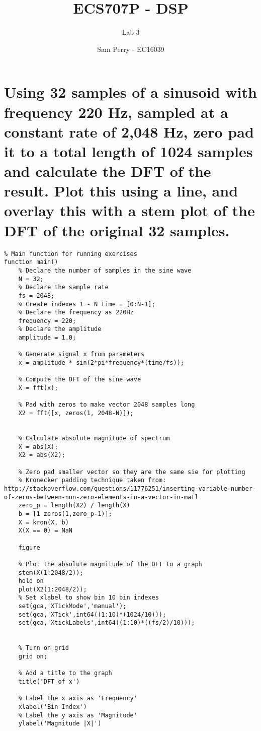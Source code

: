\documentclass[titlepage]{scrartcl}
\begin{document}
\title{ECS707P - DSP}
\subtitle{\LARGE{Lab 3}}
\author{Sam Perry - EC16039}

\maketitle

\section{Using 32 samples of a sinusoid with frequency 220 Hz, sampled at a
constant rate of 2,048 Hz, zero pad it to a total length of 1024 samples and
calculate the DFT of the result. Plot this using a line, and overlay this with
a stem plot of the DFT of the original 32 samples.}
\begin{lstlisting}
% Main function for running exercises
function main()
    % Declare the number of samples in the sine wave
    N = 32;
    % Declare the sample rate
    fs = 2048;
    % Create indexes 1 - N time = [0:N-1];
    % Declare the frequency as 220Hz
    frequency = 220;
    % Declare the amplitude
    amplitude = 1.0;

    % Generate signal x from parameters
    x = amplitude * sin(2*pi*frequency*(time/fs));

    % Compute the DFT of the sine wave
    X = fft(x);
    
    % Pad with zeros to make vector 2048 samples long
    X2 = fft([x, zeros(1, 2048-N)]);


    % Calculate absolute magnitude of spectrum
    X = abs(X);
    X2 = abs(X2);

    % Zero pad smaller vector so they are the same sie for plotting
    % Kronecker padding technique taken from: http://stackoverflow.com/questions/11776251/inserting-variable-number-of-zeros-between-non-zero-elements-in-a-vector-in-matl
    zero_p = length(X2) / length(X)
    b = [1 zeros(1,zero_p-1)];
    X = kron(X, b)
    X(X == 0) = NaN

    figure

    % Plot the absolute magnitude of the DFT to a graph
    stem(X(1:2048/2));
    hold on
    plot(X2(1:2048/2));
    % Set xlabel to show bin 10 bin indexes
    set(gca,'XTickMode','manual');
    set(gca,'XTick',int64((1:10)*(1024/10)));
    set(gca,'XtickLabels',int64((1:10)*((fs/2)/10)));


    % Turn on grid
    grid on;
    
    % Add a title to the graph
    title('DFT of x')
    
    % Label the x axis as 'Frequency'
    xlabel('Bin Index')
    % Label the y axis as 'Magnitude'
    ylabel('Magnitude |X|')
\end{lstlisting}
\end{document}
